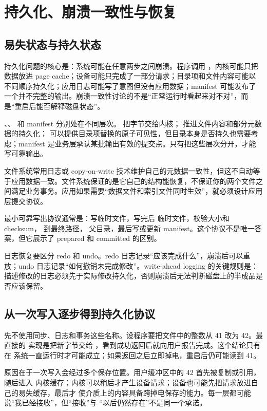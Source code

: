 \chapter{持久化、崩溃一致性与恢复}

\section{易失状态与持久状态}

持久化问题的核心是：系统可能在任意两步之间崩溃。程序调用 ，内核可能只把数据放进 page cache；设备可能只完成了一部分请求；目录项和文件内容可能以不同顺序持久化；应用日志可能写了意图但没有应用数据；manifest 可能发布了一个并不完整的输出。崩溃一致性讨论的不是“正常运行时看起来对不对”，而是“重启后能否解释磁盘状态”。

、、 和 manifest 分别处在不同层次。 把字节交给内核； 推进文件内容和部分元数据的持久化； 可以提供目录项替换的原子可见性，但目录本身是否持久也需要考虑；manifest 是业务层承认某批输出有效的提交点。只有把这些层次分开，才能写可靠输出。

文件系统常用日志或 copy-on-write 技术维护自己的元数据一致性，但这不自动等于应用数据一致。文件系统保证的是它自己的结构能恢复，不保证你的两个文件之间满足业务事务。应用如果需要“数据文件和索引文件同时生效”，就必须设计应用层提交协议。

最小可靠写出协议通常是：写临时文件，写完后  临时文件，校验大小和 checksum， 到最终路径， 父目录，最后写或更新 manifest。这个协议不是唯一答案，但它展示了 prepared 和 committed 的区别。

日志恢复要区分 redo 和 undo。redo 日志记录“应该完成什么”，崩溃后可以重放；undo 日志记录“如何撤销未完成修改”。write-ahead logging 的关键规则是：描述修改的日志必须先于实际修改持久化，否则崩溃后无法判断磁盘上的半成品是否应该保留。

\section{从一次写入逐步得到持久化协议}

先不使用同步、日志和事务这些名称。设程序要把文件中的整数从 41 改为 42。最直接的
实现是把新字节交给 ，看到成功返回后就向用户报告完成。这个结论只有在
系统一直运行时才可能成立；如果返回之后立即掉电，重启后仍可能读到 41。

原因在于一次写入会经过多个保存位置。用户缓冲区中的 42 首先被复制或引用，随后进入
内核缓存；内核可以稍后才产生设备请求；设备也可能先把请求放进自己的易失缓存，最后才
使介质上的内容具备跨掉电保存的能力。每一层都可能说“我已经接收”，但“接收”与
“以后仍然存在”不是同一个承诺。

